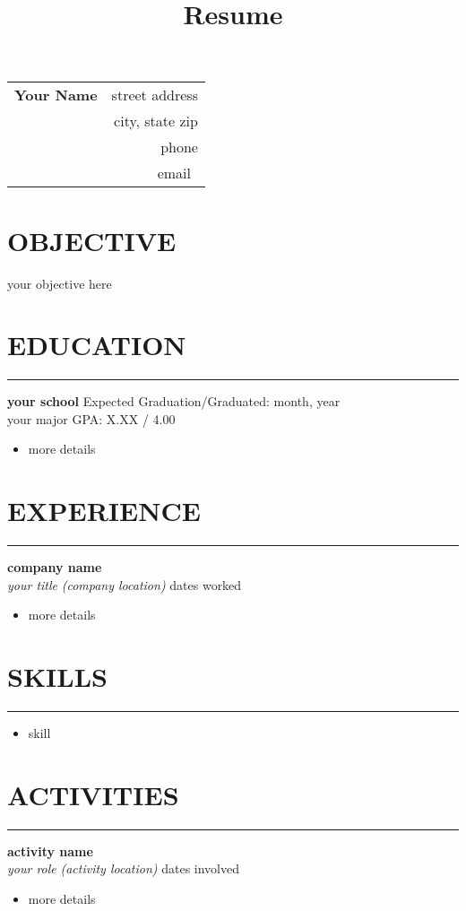 \documentclass[10pt,letterpaper]{article}
\title{Resume}
\author{\name}
\date{}
\newcommand{\objectivewidth}{0.18\textwidth} %
\newcommand{\GapOne}{12pt} %
\newcommand{\GapTwo}{6pt} %
\newcommand{\sect}[1]{ %
  \section{{#1}}
  \hrule
}
\newcommand{\sectlist}[1]{ %
  \section{{#1}}
  \hrule
  \vspace{\GapTwo} %
}
\newcommand{\school}[4]{ %
  \vspace{\GapTwo} %
  \textbf{{#1}} \hfill {#3}\\ %
  {#2} \hfill {#4} %
}
\newcommand{\entry}[4]{ %
  \vspace{\GapTwo} %
  \textbf{{#1}}\\ %
  \textit{#2} \textit{(#3)} \hfill {#4} %
}
\newcommand{\role}[3]{ %
  \vspace{\GapTwo} %
  \textit{#1} \textit{(#2)} \hfill {#3} %
}
\newcommand{\name}{Your Name}
\newcommand{\addressone}{street address}
\newcommand{\addresstwo}{city, state zip}
\newcommand{\phone}{phone}
\newcommand{\email}{email}
\newlength{\shiftdown}
\begin{document}
\begin{table}
\begin{tabularx}{\hsize}[t]{@{}Xr@{}}
\multirow{1}{*}[\shiftdown]{\Huge\bfseries \name} & \addressone\\
& \addresstwo\\
& \phone\\
& \email\
\end{tabularx}
\end{table}


\begin{minipage}{\objectivewidth}
  \section{OBJECTIVE}
\end{minipage}
\hfill
\begin{minipage}{\textwidth - \objectivewidth}
  \vspace{\GapOne}
  your objective here
  \vspace{\GapOne}
\end{minipage}


\sect{EDUCATION}

\school{your school}
{your major}
{Expected Graduation/Graduated: month, year}
{GPA: X.XX / 4.00}
\begin{itemize}
\item more details
\end{itemize}


\sect{EXPERIENCE}

\entry{company name}
{your title}
{company location}
{dates worked}
\begin{itemize}
\item more details
\end{itemize}


\sectlist{SKILLS}

\begin{itemize}
\item skill
\end{itemize}


\sect{ACTIVITIES}

\entry{activity name}
{your role}
{activity location}
{dates involved}
\begin{itemize}
\item more details
\end{itemize}
\end{document}
